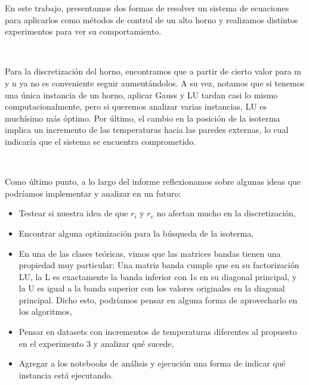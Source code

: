 
En este trabajo, presentamos dos formas de resolver un sistema de ecuaciones para aplicarlos como métodos de control de un alto horno y realizamos distintos experimentos para ver su comportamiento. 

\

Para la discretización del horno, encontramos que a partir de cierto valor para m y n ya no es conveniente seguir aumentándolos. A su vez, notamos que si tenemos una única instancia de un horno, aplicar Gauss y LU tardan casi lo mismo computacionalmente, pero si queremos analizar varias instancias, LU es muchísimo más óptimo. Por último, el cambio en la posición de la isoterma implica un incremento de las temperaturas hacia las paredes externas, lo cual indicaría que el sistema se encuentra comprometido.

\

Como último punto, a lo largo del informe reflexionamos sobre algunas ideas que podríamos implementar y analizar en un futuro:
\begin{itemize}
    \item Testear si nuestra idea de que $r_i$ y $r_e$ no afectan mucho en la discretización,
    \item Encontrar alguna optimización para la búsqueda de la isoterma,
    \item  En una de las clases teóricas, vimos que las matrices bandas tienen una propiedad muy particular: Una matriz banda cumple que en su factorización LU, la L es exactamente la  banda inferior con 1s en su diagonal principal, y la U es igual a la banda superior con los valores originales en la diagonal principal. Dicho esto, podríamos pensar en alguna forma de aprovecharlo en los algoritmos,
    \item Pensar en datasets con incrementos de temperaturas diferentes al propuesto en el experimento 3 y analizar qué sucede,
    \item Agregar a los notebooks de análisis y ejecución una forma de indicar qué instancia está ejecutando.
    
\end{itemize}


